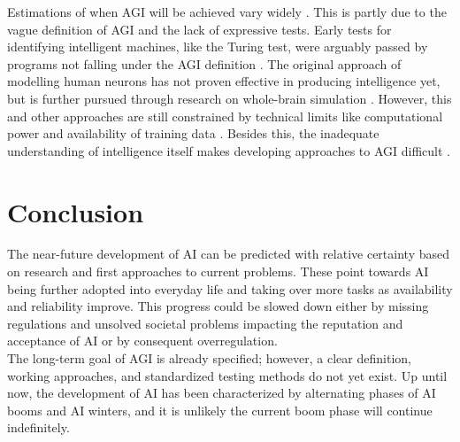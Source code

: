 \documentclass[a4paper, conference]{IEEEtran}
\begin{document}
Estimations of when AGI will be achieved vary widely \cite{scienceAgiDiscussion, zhang2022forecasting, Fjelland2020}. This is partly due to the vague definition of AGI and the lack of expressive tests. Early tests for identifying intelligent machines, like the Turing test, were arguably passed by programs not falling under the AGI definition \cite[p. 1796]{aiModernApproach}. The original approach of modelling human neurons has not proven effective in producing intelligence yet, but is further pursued through research on whole-brain simulation \cite{Stiefel2019}. However, this and other approaches are still constrained by technical limits like computational power and availability of training data \cite[pp. 681-703]{aiStructuresStrategies}. Besides this, the inadequate understanding of intelligence itself makes developing approaches to AGI difficult \cite[pp. 24-29]{littman2022gathering}.\\

\section{Conclusion}
The near-future development of AI can be predicted with relative certainty based on research and first approaches to current problems. These point towards AI being further adopted into everyday life and taking over more tasks as availability and reliability improve. This progress could be slowed down either by missing regulations and unsolved societal problems impacting the reputation and acceptance of AI or by consequent overregulation.\\

The long-term goal of AGI is already specified; however, a clear definition, working approaches, and standardized testing methods do not yet exist. Up until now, the development of AI has been characterized by alternating phases of AI booms and AI winters, and it is unlikely the current boom phase will continue indefinitely.\\

\printbibliography
\end{document}
